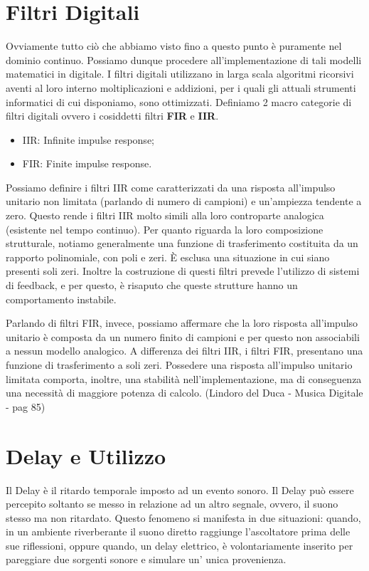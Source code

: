 \section{Filtri Digitali}

Ovviamente tutto ciò che abbiamo visto fino a questo punto è puramente nel dominio continuo. Possiamo dunque procedere all’implementazione di tali modelli matematici in digitale. I filtri digitali utilizzano in larga scala algoritmi ricorsivi aventi al loro interno moltiplicazioni e addizioni, per i quali gli attuali strumenti informatici di cui disponiamo, sono ottimizzati. Definiamo 2 macro categorie di filtri digitali ovvero i cosiddetti filtri \textbf{FIR} e \textbf{IIR}.
\begin{itemize}
\item IIR: Infinite impulse response;
\item FIR: Finite impulse response.
\end{itemize}
Possiamo definire i filtri IIR come caratterizzati da una risposta all’impulso unitario non limitata (parlando di numero di campioni) e un’ampiezza tendente a zero.
Questo rende i filtri IIR molto simili alla loro controparte analogica (esistente nel tempo continuo).
Per quanto riguarda la loro composizione strutturale, notiamo generalmente una funzione di trasferimento costituita da un rapporto polinomiale, con poli e zeri. È esclusa una situazione in cui siano presenti soli zeri. Inoltre la costruzione di questi filtri prevede l’utilizzo di sistemi di feedback, e per questo, è risaputo che queste strutture hanno un comportamento instabile. 

Parlando di filtri FIR, invece, possiamo affermare che la loro risposta all’impulso unitario è composta da un numero finito di campioni e per questo non associabili a nessun modello analogico.
A differenza dei filtri IIR, i filtri FIR, presentano una funzione di trasferimento a soli zeri.
Possedere una risposta all’impulso unitario limitata comporta, inoltre, una stabilità nell'implementazione, ma di conseguenza una necessità di maggiore potenza di calcolo.
(Lindoro del Duca - Musica Digitale - pag 85)

\section{Delay e Utilizzo}
Il Delay è il ritardo temporale imposto ad un evento sonoro. Il Delay può essere percepito soltanto se messo in relazione ad un altro segnale, ovvero, il suono stesso ma non ritardato.
Questo fenomeno si manifesta in due situazioni: quando, in un ambiente riverberante il suono diretto raggiunge l’ascoltatore prima delle sue riflessioni, oppure quando, un delay elettrico, è volontariamente inserito per pareggiare due sorgenti sonore e simulare un’ unica provenienza.

